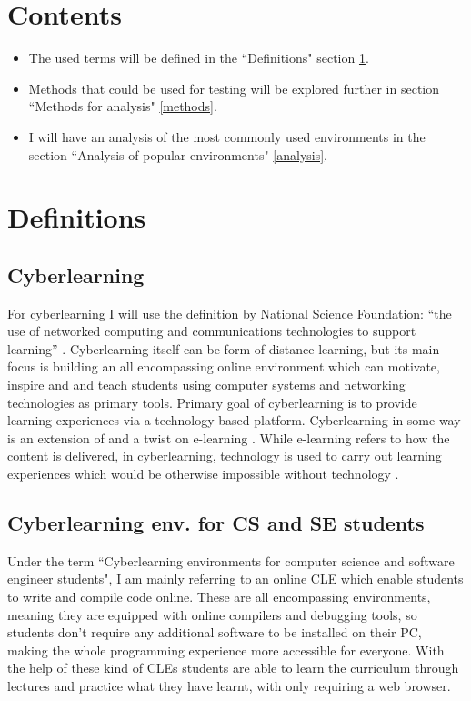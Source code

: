 \documentclass[10pt,english,a4paper]{article}
\begin{document}
\section*{Contents}

\begin{itemize}
     \item The used terms will be defined in the ``Definitions" section \ref{definitions}.
     \item Methods that could be used for testing will be explored further in section ``Methods for analysis" \ref{methods}.
     \item I will have an analysis of the most commonly used environments in the section ``Analysis of popular environments" \ref{analysis}.
\end{itemize}


\section{Definitions}\label{definitions}

\subsection{Cyberlearning}
For cyberlearning I will use the definition by National Science Foundation: 
``the use of networked computing and communications technologies to support learning” \cite{borgman_2017_fostering}.
Cyberlearning itself can be form of distance learning, but its main focus is building an all 
encompassing online environment which can motivate, inspire and and teach students using 
computer systems and networking technologies as primary tools\cite{ui/ux}.
Primary goal of cyberlearning is to provide learning experiences via a technology-based platform. 
Cyberlearning in some way is an extension of and a twist on e-learning \cite{lynch_2020_cyberlearning}.
While e-learning refers to how the content is delivered, in cyberlearning, technology
is used to carry out learning experiences which would be otherwise impossible without technology \cite{lynch_2020_cyberlearning}.

\subsection{Cyberlearning env. for CS and SE students}
Under the term ``Cyberlearning environments for computer science and software engineer students", I am mainly
referring to an online CLE which enable students to write and compile code online. These are all encompassing
environments, meaning they are equipped with 
online compilers and debugging tools, so students don't require any additional software to be installed on their PC, making
the whole programming experience more accessible for everyone.
With the help of these kind of CLEs students are able to learn the curriculum through lectures and practice
what they have learnt, with only requiring a web browser.
\end{document}
